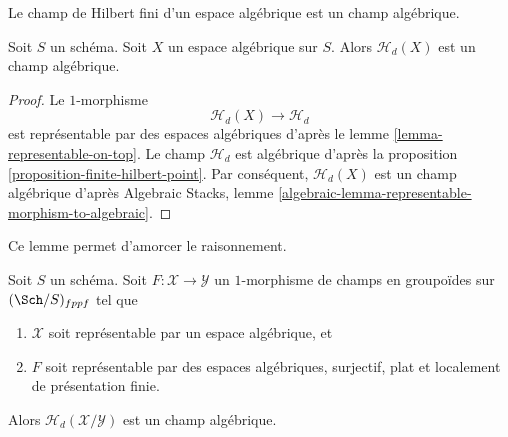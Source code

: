 \noindent
Le champ de Hilbert fini d'un espace algébrique est un champ algébrique.

\begin{lemma}
\label{lemma-hilbert-stack-of-space}
Soit $S$ un schéma.
Soit $X$ un espace algébrique sur $S$.
Alors $\mathcal{H}_d(X)$ est un champ algébrique.
\end{lemma}

\begin{proof}
Le $1$-morphisme
$$
\mathcal{H}_d(X) \longrightarrow \mathcal{H}_d
$$
est représentable par des espaces algébriques d'après le
lemme \ref{lemma-representable-on-top}.
Le champ $\mathcal{H}_d$ est algébrique d'après la
proposition \ref{proposition-finite-hilbert-point}.
Par conséquent, $\mathcal{H}_d(X)$ est un champ algébrique d'après
Algebraic Stacks,
lemme \ref{algebraic-lemma-representable-morphism-to-algebraic}.
\end{proof}

\noindent
Ce lemme permet d'amorcer le raisonnement.

\begin{lemma}
\label{lemma-hilbert-stack-relative-space}
Soit $S$ un schéma. Soit $F : \mathcal{X} \to \mathcal{Y}$ un $1$-morphisme
de champs en groupoïdes sur $(\Sch/S)_{fppf}$ tel que
\begin{enumerate}
\item $\mathcal{X}$ soit représentable par un espace algébrique, et
\item $F$ soit représentable par des espaces algébriques, surjectif, plat et
localement de présentation finie.
\end{enumerate}
Alors $\mathcal{H}_d(\mathcal{X}/\mathcal{Y})$ est un champ algébrique.
\end{lemma}

